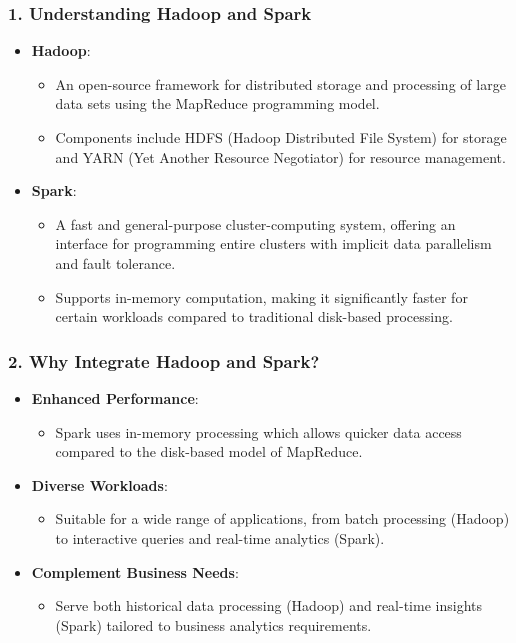 \documentclass[aspectratio=169]{beamer}
\begin{document}
\begin{frame}
    \frametitle{1. Understanding Hadoop and Spark}
    \begin{itemize}
        \item \textbf{Hadoop}:
        \begin{itemize}
            \item An open-source framework for distributed storage and processing of large data sets using the MapReduce programming model.
            \item Components include HDFS (Hadoop Distributed File System) for storage and YARN (Yet Another Resource Negotiator) for resource management.
        \end{itemize}
        \item \textbf{Spark}:
        \begin{itemize}
            \item A fast and general-purpose cluster-computing system, offering an interface for programming entire clusters with implicit data parallelism and fault tolerance.
            \item Supports in-memory computation, making it significantly faster for certain workloads compared to traditional disk-based processing.
        \end{itemize}
    \end{itemize}
\end{frame}

\begin{frame}
    \frametitle{2. Why Integrate Hadoop and Spark?}
    \begin{itemize}
        \item \textbf{Enhanced Performance}: 
        \begin{itemize}
            \item Spark uses in-memory processing which allows quicker data access compared to the disk-based model of MapReduce.
        \end{itemize}
        \item \textbf{Diverse Workloads}:
        \begin{itemize}
            \item Suitable for a wide range of applications, from batch processing (Hadoop) to interactive queries and real-time analytics (Spark).
        \end{itemize}
        \item \textbf{Complement Business Needs}:
        \begin{itemize}
            \item Serve both historical data processing (Hadoop) and real-time insights (Spark) tailored to business analytics requirements.
        \end{itemize}
    \end{itemize}
\end{frame}
\end{document}
